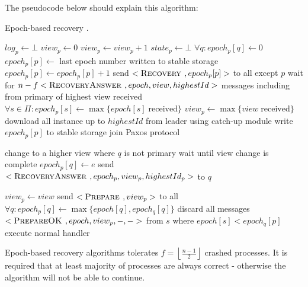 The pseudocode below should explain this algorithm:
\begin{algorithm}
  \caption{Epoch-based recovery \protect\cite{Nun10}.}
  \begin{algorithmic}[1]
    \INIT{}
      \STATE $log_p \leftarrow \bot$ %
      \STATE $view_p \leftarrow 0$
        \STATE $view_p \leftarrow view_p + 1$
      \ENDIF
      \STATE $state_p \leftarrow \bot$ %
      \STATE $\forall q : epoch_p[q] \leftarrow 0$
      \STATE
        \STATE $epoch_p[p] \leftarrow$ last epoch number written to stable storage
        \STATE $epoch_p[p] \leftarrow epoch_p[p] + 1$
        \STATE send $<\textsc{Recovery }, epoch_p[p]>$ to all except $p$
        \STATE wait for $n-f <\textsc{RecoveryAnswer }, epoch, view, highestId>$ messages including from primary of highest view received
        \STATE $\forall s \in \Pi : epoch_p[s] \leftarrow \max\{{epoch[s] \; \mathrm{ received}}\}$
        \STATE $view_p \leftarrow \max\{{ view \; \mathrm{received}}\}$
        \STATE download all instance up to $highestId$ from leader using catch-up module
      \ENDIF
        \STATE write $epoch_p[p]$ to stable storage
      \STATE
      \STATE join Paxos protocol
    \ENDINIT

    \vspace{1em}
        \STATE change to a higher view where $q$ is not primary
        \STATE wait until view change is complete
      \ENDIF
      \STATE $epoch_p[q] \leftarrow e$
      \STATE send $<\textsc{RecoveryAnswer }, epoch_p, view_p, highestId_p>$ to $q$
    \ENDUPON

    \vspace{1em}
        \STATE $view_p \leftarrow view$
        \STATE send $<\textsc{Prepare }, view_p>$ to all
      \ELSE
        \STATE $\forall q : epoch_p[q] \leftarrow \max\{{epoch[q], epoch_q[q]}\}$
          \STATE discard all messages $<\textsc{PrepareOK }, epoch, view_p, -, ->$ from $s$ where $epoch[s] < epoch_q[p]$
        \ENDFOR
        \STATE execute normal handler 
      \ENDIF
    \ENDUPON
  \end{algorithmic}
\end{algorithm}

Epoch-based recovery algorithms tolerates $f = \left\lfloor \frac{n-1}{2} \right\rfloor $ crashed processes. It is required that at least majority of processes are always correct - otherwise the algorithm will not be able to continue.

